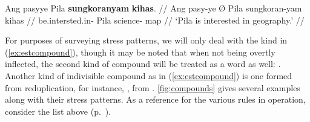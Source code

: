 \a\label{ex:adhoccompound}\begingl
	\gla Ang pasyye {} Pila \textbf{sungkoranyam} \textbf{kihas}. //
	\glb Ang pasy-ye Ø Pila sungkoran-yam kihas //
	\glc \AgtT{} be.intersted.in-\TsgF{} \Top{} Pila science-\Dat{} map //
	\glft `Pila is interested in geography.' //
\endgl
\xe

For purposes of surveying stress patterns, we will only deal with the kind in 
(\ref{ex:estcompound}), though it may be noted that when not being overtly 
inflected, the second kind of compound will be treated as a word as well:
. Another kind of indivisible 
compound as in (\ref{ex:estcompound}) is one formed from reduplication, for 
instance, , from 
. \autoref{fig:compounds} gives several examples 
along with their stress patterns. As a reference for the various rules in 
operation, consider the list above (p.~\pageref{2sylsumm}).

